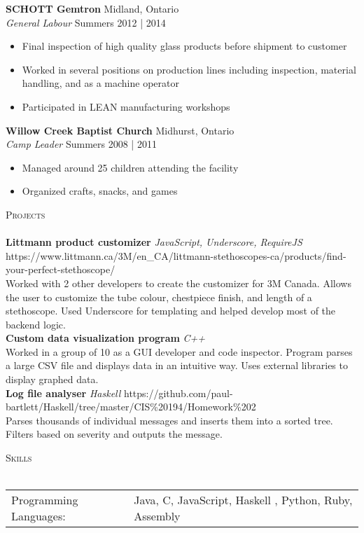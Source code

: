 \documentclass[a4paper]{article}
\newcommand{\lineunder} {
    \vspace*{-8pt} \\
    \hspace*{-18pt} \hrulefill \\
}
\newcommand{\header} [1] {
    {\hspace*{-18pt}\vspace*{6pt} \textsc{#1}}
    \vspace*{-6pt} \lineunder
}
\begin{document}
\textbf{SCHOTT Gemtron} \hfill Midland, Ontario\\
\textit{General Labour} \hfill Summers 2012 | 2014\\
\vspace{-1mm}
\begin{itemize} \itemsep 1pt
	\item Final inspection of high quality glass products before shipment to customer
	\item Worked in several positions on production lines including inspection, material handling, and as a machine operator
	\item Participated in LEAN manufacturing workshops
\end{itemize}

\textbf{Willow Creek Baptist Church} \hfill Midhurst, Ontario\\
\textit{Camp Leader} \hfill Summers 2008 | 2011\\
\vspace{-1mm}
\begin{itemize} \itemsep 1pt
	\item Managed around 25 children attending the facility
	\item Organized crafts, snacks, and games
\end{itemize}

\header{Projects}

{\textbf{Littmann product customizer} \sl JavaScript, Underscore, RequireJS} \hfill https://www.littmann.ca/3M/en\_CA/littmann-stethoscopes-ca/products/find-your-perfect-stethoscope/\\
Worked with 2 other developers to create the customizer for 3M Canada. Allows the user to customize the tube colour, chestpiece finish, and length of a stethoscope. Used Underscore for templating and helped develop most of the backend logic.\\
\vspace*{2mm}
{\textbf{Custom data visualization program} \sl C++} \\
Worked in a group of 10 as a GUI developer and code inspector. Program parses a large CSV file and displays data in an intuitive way. Uses external libraries to display graphed data.\\
\vspace*{2mm}
{\textbf{Log file analyser} \sl Haskell} \hfill https://github.com/paul-bartlett/Haskell/tree/master/CIS\%20194/Homework\%202\\
Parses thousands of individual messages and inserts them into a sorted tree. Filters based on severity and outputs the message.\\
\vspace*{2mm}

\vspace*{2mm}
        
\header{Skills}
\begin{tabular}{ l l }
	Programming Languages: & Java, C, JavaScript, Haskell , Python, Ruby, Assembly \\
\end{tabular}

\vspace*{2mm}

\ 
\end{document}
